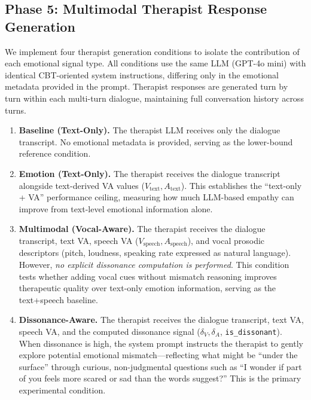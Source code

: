 \subsection{Phase 5: Multimodal Therapist Response Generation}

We implement four therapist generation conditions to isolate the contribution of each emotional signal type. All conditions use the same LLM (GPT-4o mini) with identical CBT-oriented system instructions, differing only in the emotional metadata provided in the prompt. Therapist responses are generated turn by turn within each multi-turn dialogue, maintaining full conversation history across turns.

\begin{enumerate}
    \item \textbf{Baseline (Text-Only).}
    The therapist LLM receives only the dialogue transcript. No emotional metadata is provided, serving as the lower-bound reference condition.
    
    \item \textbf{Emotion (Text-Only).}
    The therapist receives the dialogue transcript alongside text-derived VA values ($V_{\text{text}}, A_{\text{text}}$). This establishes the ``text-only + VA'' performance ceiling, measuring how much LLM-based empathy can improve from text-level emotional information alone.
    
    \item \textbf{Multimodal (Vocal-Aware).}
    The therapist receives the dialogue transcript, text VA, speech VA ($V_{\text{speech}}, A_{\text{speech}}$), and vocal prosodic descriptors (pitch, loudness, speaking rate expressed as natural language). However, \emph{no explicit dissonance computation is performed}. This condition tests whether adding vocal cues without mismatch reasoning improves therapeutic quality over text-only emotion information, serving as the text+speech baseline.
    
    \item \textbf{Dissonance-Aware.}
    The therapist receives the dialogue transcript, text VA, speech VA, and the computed dissonance signal ($\delta_V, \delta_A$, \texttt{is\_dissonant}). When dissonance is high, the system prompt instructs the therapist to gently explore potential emotional mismatch---reflecting what might be ``under the surface'' through curious, non-judgmental questions such as ``I wonder if part of you feels more scared or sad than the words suggest?'' This is the primary experimental condition.
\end{enumerate}


